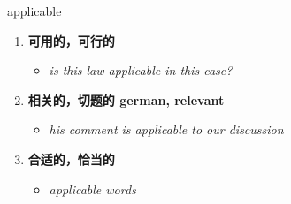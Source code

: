 
\begin{frame}
{\huge applicable}
\begin{center}
\begin{enumerate}\Large
  \item \textbf{可用的，可行的}
  \begin{itemize}
    \item \em{\Large{is this law applicable in this case?}}
  \end{itemize}
  \item \textbf{相关的，切题的 german, relevant}
  \begin{itemize}
    \item \em{\Large{his comment is applicable to our discussion}}
  \end{itemize}
  \item \textbf{合适的，恰当的}
  \begin{itemize}
    \item \em{\Large{applicable words}}
  \end{itemize}
\end{enumerate}
\end{center}
\end{frame}
